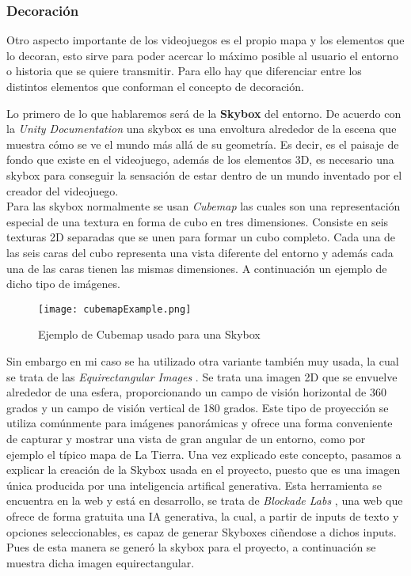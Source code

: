 \subsubsection{Decoración}

Otro aspecto importante de los videojuegos es el propio mapa y los elementos que lo decoran, esto sirve para poder acercar lo máximo posible al usuario 
el entorno o historia que se quiere transmitir. Para ello hay que diferenciar entre los distintos elementos que conforman el concepto de decoración.

Lo primero de lo que hablaremos será de la \textbf{Skybox} del entorno. De acuerdo con la \textit{Unity Documentation} una skybox es una envoltura alrededor de la escena que muestra cómo se ve el mundo más allá de su geometría. Es decir, es el paisaje de fondo que existe en el videojuego, además de los elementos 3D, es necesario una skybox para conseguir la sensación de estar dentro de un mundo inventado por el creador del videojuego.\\

Para las skybox normalmente se usan  \textit{Cubemap} \cite{Cubemaps} las cuales son una representación especial de una textura en forma de cubo en tres dimensiones. Consiste en seis texturas 2D separadas que se unen para formar un cubo completo. Cada una de las seis caras del cubo representa una vista diferente del entorno y además cada una de las caras tienen las mismas dimensiones. A continuación un ejemplo de dicho tipo de imágenes.\\

\begin{figure}[H]
    \centering
    \texttt{[image: cubemapExample.png]}
    \caption{Ejemplo de Cubemap usado para una Skybox}
\end{figure}

Sin embargo en mi caso se ha utilizado otra variante también muy usada, la cual se trata de las \textit{Equirectangular Images} \cite{EquirectangularImages}. Se trata una imagen 2D que se envuelve alrededor de una esfera, proporcionando un campo de visión horizontal de 360 grados y un campo de visión vertical de 180 grados. Este tipo de proyección se utiliza comúnmente para imágenes panorámicas y ofrece una forma conveniente de capturar y mostrar una vista de gran angular de un entorno, como por ejemplo el típico mapa de La Tierra.
Una vez explicado este concepto, pasamos a explicar la creación de la Skybox usada en el proyecto, puesto que es una imagen única producida por una inteligencia artifical generativa. Esta herramienta se encuentra en la web y está en desarrollo, se trata de \textit{Blockade Labs} \cite{BlockadeLabs}, una web que ofrece de forma gratuita una IA generativa, la cual, a partir de inputs de texto y opciones seleccionables, es capaz de generar Skyboxes ciñendose a dichos inputs. Pues de esta manera se generó la skybox para el proyecto, a continuación se muestra dicha imagen equirectangular.

